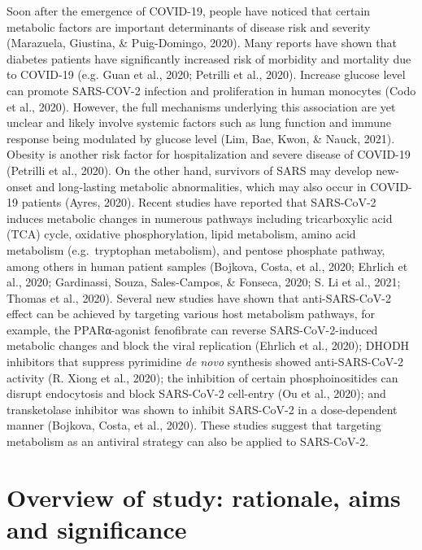 \documentclass[12pt,twoside,openany,\mydriver]{thesis}  %
\begin{document}
Soon after the emergence of COVID-19, people have noticed that certain metabolic factors are important determinants of disease risk and severity (Marazuela, Giustina, \& Puig-Domingo, 2020). Many reports have shown that diabetes patients have significantly increased risk of morbidity and mortality due to COVID-19 (e.g. Guan et al., 2020; Petrilli et al., 2020). Increase glucose level can promote SARS-COV-2 infection and proliferation in human monocytes (Codo et al., 2020). However, the full mechanisms underlying this association are yet unclear and likely involve systemic factors such as lung function and immune response being modulated by glucose level (Lim, Bae, Kwon, \& Nauck, 2021). Obesity is another risk factor for hospitalization and severe disease of COVID-19 (Petrilli et al., 2020). On the other hand, survivors of SARS may develop new-onset and long-lasting metabolic abnormalities, which may also occur in COVID-19 patients (Ayres, 2020). Recent studies have reported that SARS-CoV-2 induces metabolic changes in numerous pathways including tricarboxylic acid (TCA) cycle, oxidative phosphorylation, lipid metabolism, amino acid metabolism (e.g.~tryptophan metabolism), and pentose phosphate pathway, among others in human patient samples (Bojkova, Costa, et al., 2020; Ehrlich et al., 2020; Gardinassi, Souza, Sales-Campos, \& Fonseca, 2020; S. Li et al., 2021; Thomas et al., 2020). Several new studies have shown that anti-SARS-CoV-2 effect can be achieved by targeting various host metabolism pathways, for example, the PPARα-agonist fenofibrate can reverse SARS-CoV-2-induced metabolic changes and block the viral replication (Ehrlich et al., 2020); DHODH inhibitors that suppress pyrimidine \emph{de novo} synthesis showed anti-SARS-CoV-2 activity (R. Xiong et al., 2020); the inhibition of certain phosphoinositides can disrupt endocytosis and block SARS-CoV-2 cell-entry (Ou et al., 2020); and transketolase inhibitor was shown to inhibit SARS-CoV-2 in a dose-dependent manner (Bojkova, Costa, et al., 2020). These studies suggest that targeting metabolism as an antiviral strategy can also be applied to SARS-CoV-2.

\hypertarget{overview-of-study-rationale-aims-and-significance}{%
\section{Overview of study: rationale, aims and significance}\label{overview-of-study-rationale-aims-and-significance}}
\end{document}
